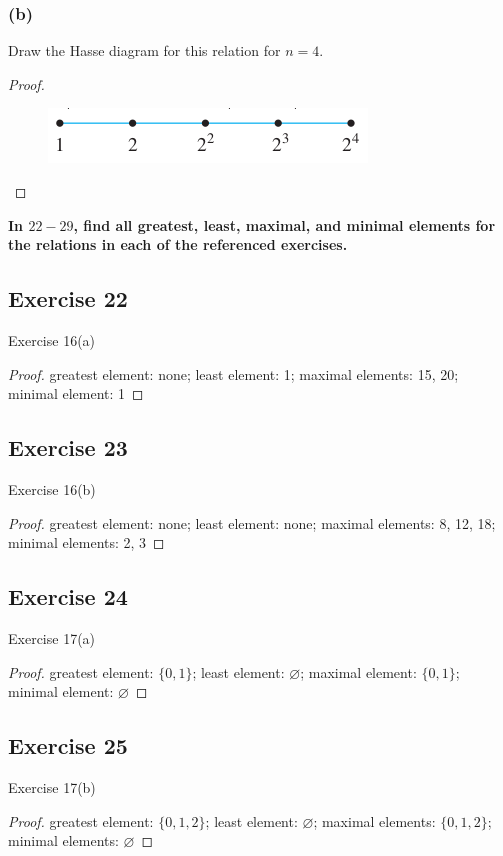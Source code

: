 \documentclass[14pt]{extarticle}
\newcommand{\es}{\varnothing}
\newcommand{\cy}{\color{cyan}}
\begin{document}
\subsubsection{(b)}
Draw the Hasse diagram for this relation for \(n = 4\).

\begin{proof}
        \begin{figure}[ht!]
                \centering
                \includegraphics[scale=0.4]{../images/8.5.21.b.png}
        \end{figure}
\end{proof}

{\bf \cy In $22-29$, find all greatest, least, maximal, and minimal elements for the relations in each of the
referenced exercises.}

\subsection{Exercise 22}
Exercise 16(a)
\begin{proof}
        greatest element: none; least element: 1; maximal elements: 15, 20; minimal element: 1
\end{proof}

\subsection{Exercise 23}
Exercise 16(b)
\begin{proof}
        greatest element: none; least element: none; maximal elements: 8, 12, 18; minimal elements: 2, 3
\end{proof}

\subsection{Exercise 24}
Exercise 17(a)
\begin{proof}
        greatest element: \(\{0, 1\}\); least element: \(\es\); maximal element: \(\{0, 1\}\); minimal element: \(\es\)
\end{proof}

\subsection{Exercise 25}
Exercise 17(b)
\begin{proof}
        greatest element: \(\{0,1,2\}\); least element: \(\es\); maximal elements: \(\{0,1,2\}\); minimal elements: \(\es\)
\end{proof}
\end{document}
